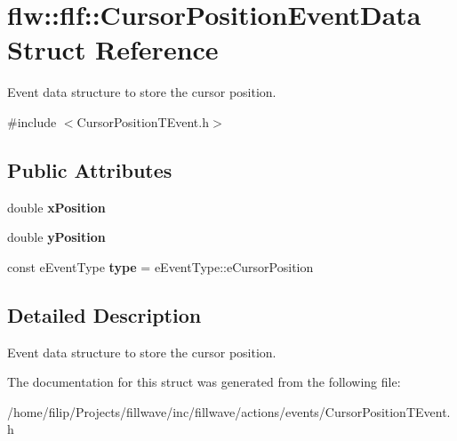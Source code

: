 \hypertarget{structflw_1_1flf_1_1CursorPositionEventData}{}\section{flw\+:\+:flf\+:\+:Cursor\+Position\+Event\+Data Struct Reference}
\label{structflw_1_1flf_1_1CursorPositionEventData}


Event data structure to store the cursor position.  




{\ttfamily \#include $<$Cursor\+Position\+T\+Event.\+h$>$}

\subsection*{Public Attributes}
\begin{DoxyCompactItemize}
\item 
double {\bfseries x\+Position}\hypertarget{structflw_1_1flf_1_1CursorPositionEventData_a81d94727e5940bfab91223fa48332df0}{}\label{structflw_1_1flf_1_1CursorPositionEventData_a81d94727e5940bfab91223fa48332df0}

\item 
double {\bfseries y\+Position}\hypertarget{structflw_1_1flf_1_1CursorPositionEventData_ad0a614b6aea762878ba9328fb56739e5}{}\label{structflw_1_1flf_1_1CursorPositionEventData_ad0a614b6aea762878ba9328fb56739e5}

\item 
const e\+Event\+Type {\bfseries type} = e\+Event\+Type\+::e\+Cursor\+Position\hypertarget{structflw_1_1flf_1_1CursorPositionEventData_ab22f8b76fce5bac8647d6ee3330b9e8f}{}\label{structflw_1_1flf_1_1CursorPositionEventData_ab22f8b76fce5bac8647d6ee3330b9e8f}

\end{DoxyCompactItemize}


\subsection{Detailed Description}
Event data structure to store the cursor position. 

The documentation for this struct was generated from the following file\+:\begin{DoxyCompactItemize}
\item 
/home/filip/\+Projects/fillwave/inc/fillwave/actions/events/Cursor\+Position\+T\+Event.\+h\end{DoxyCompactItemize}

